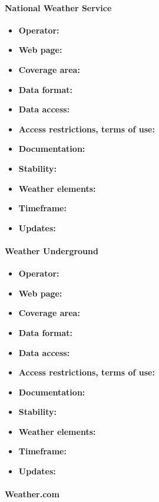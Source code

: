 \paragraph{National Weather Service}

\begin{itemize}
  \item \textbf{Operator:}
  \item \textbf{Web page:}
  \item \textbf{Coverage area:}
  \item \textbf{Data format:}
  \item \textbf{Data access:}
  \item \textbf{Access restrictions, terms of use:}
  \item \textbf{Documentation:}
  \item \textbf{Stability:}
  \item \textbf{Weather elements:}
  \item \textbf{Timeframe:}
  \item \textbf{Updates:}
\end{itemize}

\paragraph{Weather Underground}

\begin{itemize}
  \item \textbf{Operator:}
  \item \textbf{Web page:}
  \item \textbf{Coverage area:}
  \item \textbf{Data format:}
  \item \textbf{Data access:}
  \item \textbf{Access restrictions, terms of use:}
  \item \textbf{Documentation:}
  \item \textbf{Stability:}
  \item \textbf{Weather elements:}
  \item \textbf{Timeframe:}
  \item \textbf{Updates:}
\end{itemize}

\paragraph{Weather.com}

